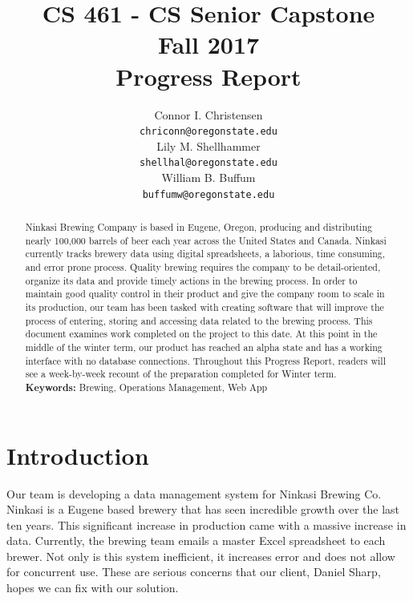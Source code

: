 \documentclass[draftclsnofoot,onecolumn,letterpaper,10pt,compsoc]{IEEEtran}
\title{CS 461 - CS Senior Capstone
	\\Fall 2017
	\\Progress Report
}
\author{
	Connor I. Christensen \\
	\texttt{chriconn@oregonstate.edu}
	\\
	Lily M. Shellhammer \\
	\texttt{shellhal@oregonstate.edu}
	\\
	William B. Buffum \\
	\texttt{buffumw@oregonstate.edu}
}
\begin{document}
\begin{titlingpage}
    \maketitle
    \begin{abstract}
			Ninkasi Brewing Company is based in Eugene, Oregon, producing and distributing nearly 100,000 barrels of beer each year across the United States and Canada.
			Ninkasi currently tracks brewery data using digital spreadsheets, a laborious, time consuming, and error prone process.
			Quality brewing requires the company to be detail-oriented, organize its data and provide timely actions in the brewing process.
			In order to maintain good quality control in their product and give the company room to scale in its production, our team has been tasked with creating software that will improve the process of entering, storing and accessing data related to the brewing process.
			This document examines work completed on the project to this date.
			At this point in the middle of the winter term, our product has reached an alpha state and has a working interface with no database connections.
			Throughout this Progress Report, readers will see a week-by-week recount of the preparation completed for Winter term.
			\\
			\textbf{Keywords:} Brewing, Operations Management, Web App
    \end{abstract}
		\pagebreak
		\tableofcontents
\end{titlingpage}


\section{Introduction}
Our team is developing a data management system for Ninkasi Brewing Co.
Ninkasi is a Eugene based brewery that has seen incredible growth over the last ten years.
This significant increase in production came with a massive increase in data.
Currently, the brewing team emails a master Excel spreadsheet to each brewer.
Not only is this system inefficient, it increases error and does not allow for concurrent use.
These are serious concerns that our client, Daniel Sharp, hopes we can fix with our solution.
\end{document}
